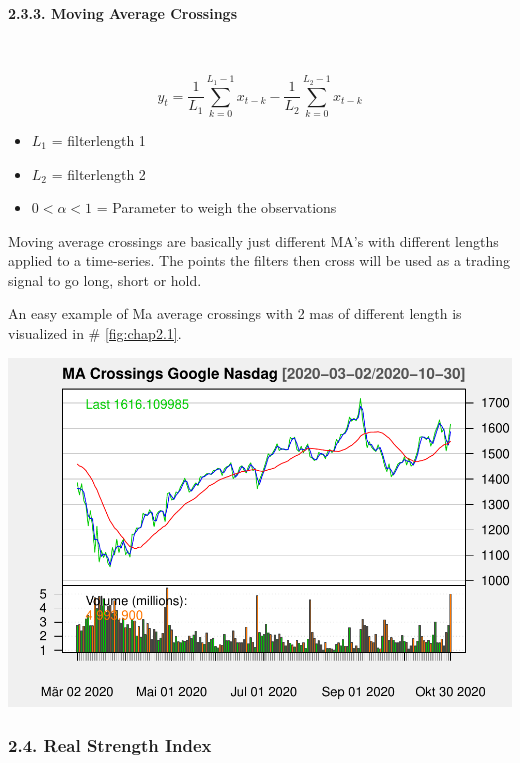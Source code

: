 \documentclass[
]{article}
\providecommand{\tightlist}{%
  \setlength{\itemsep}{0pt}\setlength{\parskip}{0pt}}
\begin{document}
\hypertarget{moving-average-crossings}{%
\paragraph{2.3.3. Moving Average
Crossings}\label{moving-average-crossings}}

~

\begin{equation}
  \label{eq:mac}
  y_{t}=\frac{1}{L_1}\sum_{k=0}^{L_1-1}x_{t-k} - \frac{1}{L_2}\sum_{k=0}^{L_2-1}x_{t-k}
\end{equation}

\begin{itemize}
\tightlist
\item
  \({L_1}\) = filterlength 1
\item
  \({L_2}\) = filterlength 2
\item
  \({0 < \alpha < 1}\) = Parameter to weigh the observations
\end{itemize}

Moving average crossings are basically just different MA's with
different lengths applied to a time-series. The points the filters then
cross will be used as a trading signal to go long, short or hold.

An easy example of Ma average crossings with 2 mas of different length
is visualized in \# \ref{fig:chap2.1}.

\begin{center}\includegraphics[width=0.7\linewidth]{00_main_files/figure-latex/chap2.3.3 -1} \end{center}

\newpage

\hypertarget{real-strength-index}{%
\subsubsection{2.4. Real Strength Index}\label{real-strength-index}}
\end{document}
